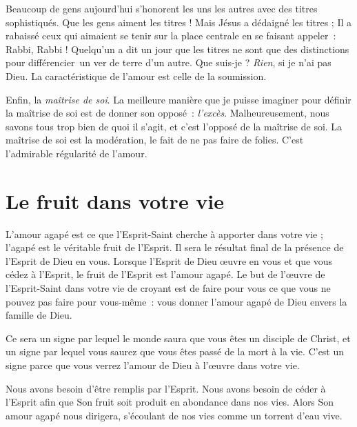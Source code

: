 Beaucoup de gens aujourd'hui s'honorent les uns les autres
 avec des titres sophistiqués. Que les gens aiment les titres !
 Mais Jésus a dédaigné les titres ; Il a rabaissé ceux qui aimaient
 se tenir sur la place centrale en se faisant appeler~:
 \Og Rabbi, Rabbi ! \Fg{}
 Quelqu'un a dit un jour que les titres ne sont que des distinctions
 pour différencier~un ver de terre d'un autre. Que suis-je ?
 \emph{Rien}, si je n'ai pas Dieu. La caractéristique de l'amour
 est celle de la soumission.

Enfin, la \emph{maîtrise de soi}. La meilleure manière que je puisse imaginer
 pour définir la maîtrise de soi est de donner son opposé~: \emph{l'excès}.
 Malheureusement, nous savons tous trop bien de quoi il s'agit,
 et c'est l'opposé de la maîtrise de soi.
 La maîtrise de soi est la modération, le fait de ne pas faire de folies.
 C'est l'admirable régularité de l'amour.


\section{Le fruit dans votre vie}

L'amour agapé est ce que l'Esprit-Saint cherche à apporter dans votre vie ;
 l'agapé est le véritable fruit de l'Esprit.
 Il sera le résultat final de la présence de l'Esprit de Dieu en vous.
 Lorsque l'Esprit de Dieu œuvre en vous et que vous cédez à l'Esprit,
 le fruit de l'Esprit est l'amour agapé. Le but de l'œuvre de
 l'Esprit-Saint dans votre vie de croyant est de faire pour vous
 ce que vous ne pouvez pas faire pour vous-même~:
 vous donner l'amour agapé de Dieu envers la famille de Dieu.

Ce sera un signe par lequel le monde saura que vous êtes un disciple
 de Christ, et un signe par lequel vous saurez que vous êtes passé
 de la mort à la vie. C'est un signe parce que vous verrez
 l'amour de Dieu à l'œuvre dans votre vie.

Nous avons besoin d'être remplis par l'Esprit.
 Nous avons besoin de céder à l'Esprit afin que Son fruit soit produit
 en abondance dans nos vies. Alors Son amour agapé nous dirigera,
 s'écoulant de nos vies comme un torrent d'eau vive.
\closechapter
{}

